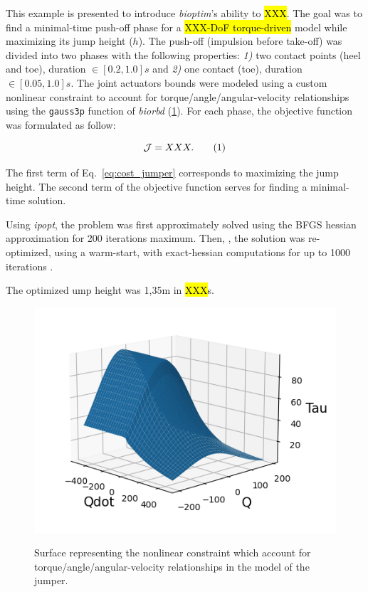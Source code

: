 This example is presented to introduce \textit{bioptim}'s ability to \hl{XXX}.
The goal was to find a minimal-time push-off phase for a \hl{XXX-DoF torque-driven} model while maximizing its jump height ($h$).
The push-off (impulsion before take-off) was divided into two phases with the following properties: \textit{1)} two contact points (heel and toe), duration $\in [0.2, 1.0]s$ and \textit{2)} one contact (toe), duration $\in [0.05, 1.0]s$.
The joint actuators bounds were modeled using a custom nonlinear constraint to account for torque/angle/angular-velocity relationships using the \verb?gauss3p? function of \textit{biorbd}  (\ref{fig:graph_force_vitesse_longueur}).
For each phase, the objective function was formulated as follow:

\[
\mathcal{J} = XXX.
\addtag
\label{eq:cost_jumper}
\]

The first term of Eq.~\ref{eq:cost_jumper} corresponds to maximizing the jump height.
The second term of the objective function serves for finding a minimal-time solution.

Using \textit{ipopt}, the problem was first approximately solved using the BFGS hessian approximation for 200 iterations maximum.
Then, , the solution was re-optimized, using a warm-start, with exact-hessian computations for up to 1000 iterations .

The optimized ump height was 1,35m in \hl{XXX}s.

\begin{figure}[h!]
\includegraphics[width=\columnwidth]{figures/graph_force_vitesse_longueur.png}\\
\caption{Surface representing the nonlinear constraint which account for torque/angle/angular-velocity relationships in the model of the jumper.}
\label{fig:graph_force_vitesse_longueur}
\end{figure}
